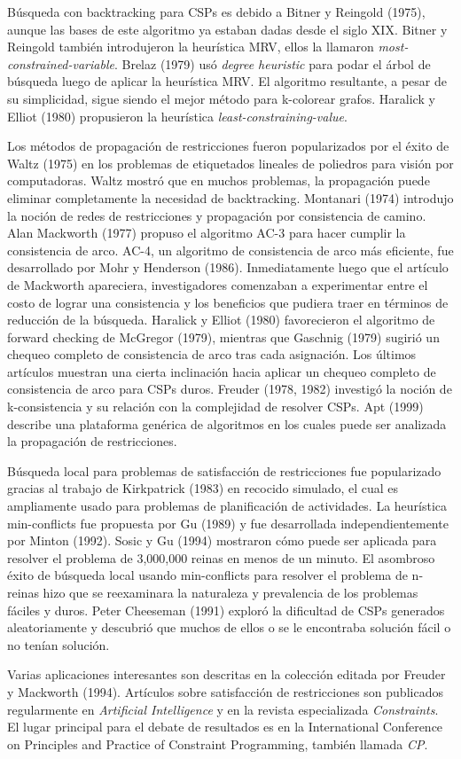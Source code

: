 B\'usqueda con backtracking para CSPs es debido a Bitner y Reingold (1975), aunque las bases de este algoritmo ya estaban dadas desde el siglo XIX. Bitner y Reingold tambi\'en introdujeron la heur\'istica MRV, ellos la llamaron \emph{most-constrained-variable}. Brelaz (1979) us\'o \emph{degree heuristic} para podar el \'arbol de b\'usqueda luego de aplicar la heur\'istica MRV. El algoritmo resultante, a pesar de su simplicidad, sigue siendo el mejor m\'etodo para k-colorear grafos. Haralick y Elliot (1980) propusieron la heur\'istica \emph{least-constraining-value}.

Los m\'etodos de propagaci\'on de restricciones fueron popularizados por el \'exito de Waltz (1975) en los problemas de etiquetados lineales de poliedros para visi\'on por computadoras. Waltz mostr\'o que en muchos problemas, la propagaci\'on puede eliminar completamente la necesidad de backtracking. Montanari (1974) introdujo la noci\'on de redes de restricciones y propagaci\'on por consistencia de camino. Alan Mackworth (1977) propuso el algoritmo AC-3 para hacer cumplir la consistencia de arco. AC-4, un algoritmo de consistencia de arco m\'as eficiente, fue desarrollado por Mohr y Henderson (1986). Inmediatamente luego que el art\'iculo de Mackworth apareciera, investigadores comenzaban a experimentar entre el costo de lograr una consistencia y los beneficios que pudiera traer en t\'erminos de reducci\'on de la b\'usqueda. Haralick y Elliot (1980) favorecieron el algoritmo de forward checking de McGregor (1979), mientras que Gaschnig (1979) sugiri\'o un chequeo completo de consistencia de arco tras cada asignaci\'on. Los \'ultimos art\'iculos muestran una cierta inclinaci\'on hacia aplicar un chequeo completo de consistencia de arco para CSPs duros. Freuder (1978, 1982) investig\'o la noci\'on de k-consistencia y su relaci\'on con la complejidad de resolver CSPs. Apt (1999) describe una plataforma gen\'erica de algoritmos en los cuales puede ser analizada la propagaci\'on de restricciones.

B\'usqueda local para problemas de satisfacci\'on de restricciones fue popularizado gracias al trabajo de Kirkpatrick (1983) en recocido simulado, el cual es ampliamente usado para problemas de planificaci\'on de actividades. La heur\'istica min-conflicts fue propuesta por Gu (1989) y fue desarrollada independientemente por Minton (1992). Sosic y Gu (1994) mostraron c\'omo puede ser aplicada para resolver el problema de 3,000,000 reinas en menos de un minuto. El asombroso \'exito de b\'usqueda local usando min-conflicts para resolver el problema de n-reinas hizo que se reexaminara la naturaleza y prevalencia de los problemas f\'aciles y duros. Peter Cheeseman (1991) explor\'o la dificultad de CSPs generados aleatoriamente y descubri\'o que muchos de ellos o se le encontraba soluci\'on f\'acil o no ten\'ian soluci\'on.

Varias aplicaciones interesantes son descritas en la colecci\'on editada por Freuder y Mackworth (1994). Art\'iculos sobre satisfacci\'on de restricciones son publicados regularmente en \emph{Artificial Intelligence} y en la revista especializada \emph{Constraints}. El lugar principal para el debate de resultados es en la International Conference on Principles and Practice of Constraint Programming, tambi\'en llamada \emph{CP}.

